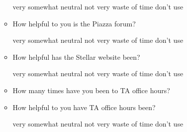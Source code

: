 \documentclass[handout]{mcs}
\begin{document}
\begin{itemize}
\begin{itemize}
\begin{center}
very\hspace{0.3in} somewhat \hspace{0.3in} neutral\hspace{0.3in} not
very \hspace{0.3in} waste of time  \hspace{0.7in}don't use
\end{center}

\iffalse
\begin{center}
very well\hspace{0.3in} mostly\hspace{0.3in} adequately\hspace{0.3in}
partially\hspace{0.3in} poorly  \hspace{0.7in} don't use
\end{center}
\fi

\item How helpful to you is the Piazza forum?

\begin{center}
very\hspace{0.3in} somewhat \hspace{0.3in} neutral\hspace{0.3in} not
very \hspace{0.3in} waste of time  \hspace{0.7in}don't use
\end{center}


\item How helpful has the Stellar website been?

\begin{center}
very\hspace{0.3in} somewhat \hspace{0.3in} neutral\hspace{0.3in} not
very \hspace{0.3in} waste of time  \hspace{0.7in}don't use
\end{center}


\item How many times have you been to TA office hours?\brule{0.7in}


\item How helpful to you have TA office hours been?
 
\begin{center}
very\hspace{0.3in} somewhat \hspace{0.3in} neutral\hspace{0.3in} not
very \hspace{0.3in} waste of time  \hspace{0.7in}don't use
\end{center}


\end{itemize}
\end{itemize}
\end{document}

